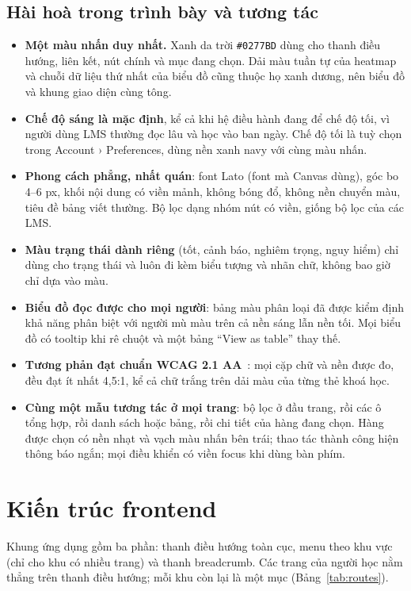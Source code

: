 \subsection{Hài hoà trong trình bày và tương tác}

\begin{itemize}
  \item \textbf{Một màu nhấn duy nhất.} Xanh da trời \texttt{\#0277BD} dùng cho thanh điều hướng, liên kết, nút chính và mục đang chọn. Dải màu tuần tự của heatmap và chuỗi dữ liệu thứ nhất của biểu đồ cũng thuộc họ xanh dương, nên biểu đồ và khung giao diện cùng tông.
  \item \textbf{Chế độ sáng là mặc định}, kể cả khi hệ điều hành đang để chế độ tối, vì người dùng LMS thường đọc lâu và học vào ban ngày. Chế độ tối là tuỳ chọn trong Account › Preferences, dùng nền xanh navy với cùng màu nhấn.
  \item \textbf{Phong cách phẳng, nhất quán}: font Lato (font mà Canvas dùng), góc bo 4--6 px, khối nội dung có viền mảnh, không bóng đổ, không nền chuyển màu, tiêu đề bảng viết thường. Bộ lọc dạng nhóm nút có viền, giống bộ lọc của các LMS.
  \item \textbf{Màu trạng thái dành riêng} (tốt, cảnh báo, nghiêm trọng, nguy hiểm) chỉ dùng cho trạng thái và luôn đi kèm biểu tượng và nhãn chữ, không bao giờ chỉ dựa vào màu.
  \item \textbf{Biểu đồ đọc được cho mọi người}: bảng màu phân loại đã được kiểm định khả năng phân biệt với người mù màu trên cả nền sáng lẫn nền tối. Mọi biểu đồ có tooltip khi rê chuột và một bảng ``View as table'' thay thế.
  \item \textbf{Tương phản đạt chuẩn WCAG 2.1 AA}~\cite{wcag21}: mọi cặp chữ và nền được đo, đều đạt ít nhất 4,5:1, kể cả chữ trắng trên dải màu của từng thẻ khoá học.
  \item \textbf{Cùng một mẫu tương tác ở mọi trang}: bộ lọc ở đầu trang, rồi các ô tổng hợp, rồi danh sách hoặc bảng, rồi chi tiết của hàng đang chọn. Hàng được chọn có nền nhạt và vạch màu nhấn bên trái; thao tác thành công hiện thông báo ngắn; mọi điều khiển có viền focus khi dùng bàn phím.
\end{itemize}

\section{Kiến trúc frontend}

Khung ứng dụng gồm ba phần: thanh điều hướng toàn cục, menu theo khu vực (chỉ cho khu có nhiều trang) và thanh breadcrumb. Các trang của người học nằm thẳng trên thanh điều hướng; mỗi khu còn lại là một mục (Bảng~\ref{tab:routes}).

